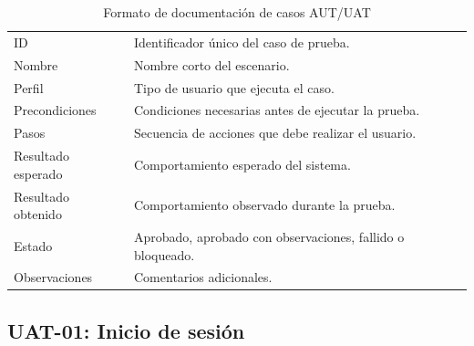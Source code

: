 \documentclass[12pt,letterpaper]{article}
\begin{document}
\begin{table}[H]
\centering
\begingroup
\footnotesize
\setlength{\tabcolsep}{3pt}
\renewcommand{\arraystretch}{1.25}

\begin{tabularx}{\textwidth}{|
>{\raggedright\arraybackslash}p{3.4cm}|
>{\raggedright\arraybackslash}X|}
\hline
\multicolumn{1}{|>{\centering\arraybackslash}m{3.4cm}|}{\textbf{Campo}} &
\multicolumn{1}{>{\centering\arraybackslash}m{10.8cm}|}{\textbf{Descripción}} \\
\hline
ID & Identificador único del caso de prueba. \\
\hline
Nombre & Nombre corto del escenario. \\
\hline
Perfil & Tipo de usuario que ejecuta el caso. \\
\hline
Precondiciones & Condiciones necesarias antes de ejecutar la prueba. \\
\hline
Pasos & Secuencia de acciones que debe realizar el usuario. \\
\hline
Resultado esperado & Comportamiento esperado del sistema. \\
\hline
Resultado obtenido & Comportamiento observado durante la prueba. \\
\hline
Estado & Aprobado, aprobado con observaciones, fallido o bloqueado. \\
\hline
Observaciones & Comentarios adicionales. \\
\hline
\end{tabularx}

\endgroup
\caption{Formato de documentación de casos AUT/UAT}
\label{tab:formato-casos-uat}
\end{table}

\subsection{UAT-01: Inicio de sesión}
\end{document}
